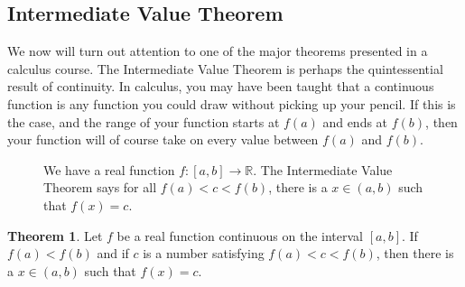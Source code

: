 \documentclass{article}
\newcommand{\R}{\mathbb{R}}
\theoremstyle{definition}
\newtheorem{theorem}{Theorem}[section]
\begin{document}
\subsection{Intermediate Value Theorem}
We now will turn out attention to one of the major theorems presented in a calculus course. The Intermediate Value Theorem is perhaps the quintessential result of continuity. In calculus, you may have been taught that a continuous function is any function you could draw without picking up your pencil. If this is the case, and the range of your function starts at $ f(a) $ and ends at $ f(b) $, then your function will of course take on every value between $ f(a) $ and $ f(b) $.  
\begin{figure}[h!]
	\centering
	\caption{We have a real function $ f:[a,b]\to\R $. The Intermediate Value Theorem says for all $f(a)< c<f(b) $, there is a $ x\in(a,b) $ such that $ f(x)=c $.}
\end{figure}
\begin{theorem}
Let $ f $ be a real function continuous on the interval $ [a,b] $. If $ f(a)<f(b) $ and if $ c $ is a number satisfying $f(a)< c<f(b) $, then there is a $ x\in(a,b) $ such that $ f(x)=c $.
\end{theorem}
\end{document}
